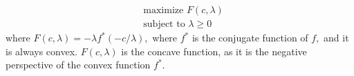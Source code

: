 \documentclass{article}
\begin{document}
\begin{align*}
&\text{maximize }  F(c, \lambda) \\
&\text{subject to }  \lambda \geq 0
\end{align*} 
where $F(c, \lambda) = - \lambda f^*(-c/\lambda), $
where $f^*$ is the conjugate function of $f,$ and it is always convex.  $F(c, \lambda)$ is the concave function, as it is the negative perspective of the convex function $f^*$.
\end{document}
